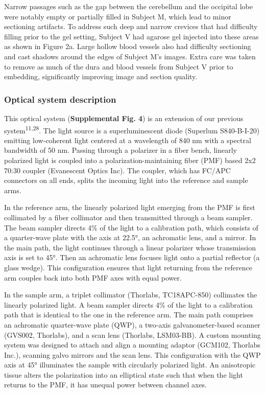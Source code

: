 \documentclass{article}
\begin{document}
Narrow passages such as the gap between the cerebellum and the occipital lobe were notably empty or partially filled in Subject M, which lead to minor sectioning artifacts. To address such deep and narrow crevices that had difficulty filling prior to the gel setting, Subject V had agarose gel injected into these areas as shown in Figure 2a. Large hollow blood vessels also had difficulty sectioning and cast shadows around the edges of Subject M’s images. Extra care was taken to remove as much of the dura and blood vessels from Subject V prior to embedding, significantly improving image and section quality.

\subsubsection*{Optical system description}

This optical system (\textbf{Supplemental Fig. 4}) is an extension of our previous system\textsuperscript{11,28}. The light source is a superluminescent diode (Superlum S840-B-I-20) emitting low-coherent light centered at a wavelength of 840 nm with a spectral bandwidth of 50 nm. Passing through a polarizer in a fiber bench, linearly polarized light is coupled into a polarization-maintaining fiber (PMF) based 2x2 70:30 coupler (Evanescent Optics Inc). The coupler, which has FC/APC connectors on all ends, splits the incoming light into the reference and sample arms.

In the reference arm, the linearly polarized light emerging from the PMF is first collimated by a fiber collimator and then transmitted through a beam sampler. The beam sampler directs 4\% of the light to a calibration path, which consists of a quarter-wave plate with the axis at 22.5°, an achromatic lens, and a mirror. In the main path, the light continues through a linear polarizer whose transmission axis is set to 45°. Then an achromatic lens focuses light onto a partial reflector (a glass wedge). This configuration ensures that light returning from the reference arm couples back into both PMF axes with equal power.

In the sample arm, a triplet collimator (Thorlabs, TC18APC-850) collimates the linearly polarized light. A beam sampler directs 4\% of the light to a calibration path that is identical to the one in the reference arm. The main path comprises an achromatic quarter-wave plate (QWP), a two-axis galvanometer-based scanner (GVS002, Thorlabs), and a scan lens (Thorlabs, LSM03-BB). A custom mounting system was designed to attach and align a mounting adaptor (GCM102, Thorlabs Inc.), scanning galvo mirrors and the scan lens. This configuration with the QWP axis at 45° illuminates the sample with circularly polarized light. An anisotropic tissue alters the  polarization into an elliptical state such that when the light returns to the PMF, it has unequal power between channel axes.
\end{document}
